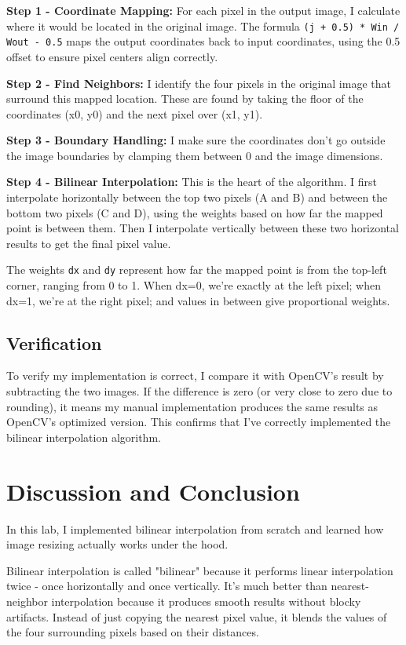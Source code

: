 \documentclass[12pt,a4paper]{report}
\begin{document}
\textbf{Step 1 - Coordinate Mapping:} For each pixel in the output image, I calculate where it would be located in the original image. The formula \texttt{(j + 0.5) * Win / Wout - 0.5} maps the output coordinates back to input coordinates, using the 0.5 offset to ensure pixel centers align correctly.

\textbf{Step 2 - Find Neighbors:} I identify the four pixels in the original image that surround this mapped location. These are found by taking the floor of the coordinates (x0, y0) and the next pixel over (x1, y1).

\textbf{Step 3 - Boundary Handling:} I make sure the coordinates don't go outside the image boundaries by clamping them between 0 and the image dimensions.

\textbf{Step 4 - Bilinear Interpolation:} This is the heart of the algorithm. I first interpolate horizontally between the top two pixels (A and B) and between the bottom two pixels (C and D), using the weights based on how far the mapped point is between them. Then I interpolate vertically between these two horizontal results to get the final pixel value.

The weights \texttt{dx} and \texttt{dy} represent how far the mapped point is from the top-left corner, ranging from 0 to 1. When dx=0, we're exactly at the left pixel; when dx=1, we're at the right pixel; and values in between give proportional weights.

\subsection{Verification}
To verify my implementation is correct, I compare it with OpenCV's result by subtracting the two images. If the difference is zero (or very close to zero due to rounding), it means my manual implementation produces the same results as OpenCV's optimized version. This confirms that I've correctly implemented the bilinear interpolation algorithm.

\newpage
\section*{Discussion and Conclusion}

In this lab, I implemented bilinear interpolation from scratch and learned how image resizing actually works under the hood. 

Bilinear interpolation is called "bilinear" because it performs linear interpolation twice - once horizontally and once vertically. It's much better than nearest-neighbor interpolation because it produces smooth results without blocky artifacts. Instead of just copying the nearest pixel value, it blends the values of the four surrounding pixels based on their distances.
\end{document}
